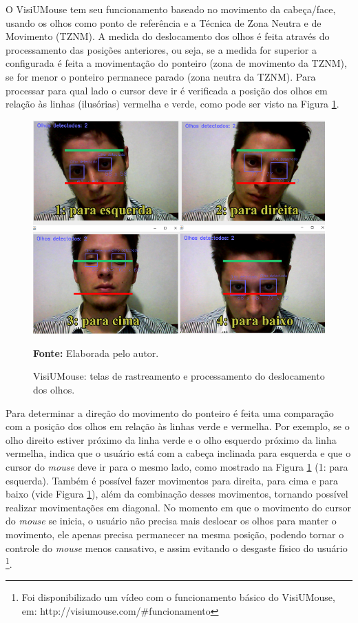 O VisiUMouse tem seu funcionamento baseado no movimento da cabeça/face, usando os olhos como ponto de referência e a Técnica de Zona Neutra e de Movimento (TZNM). A medida do deslocamento dos olhos é feita através do processamento das posições anteriores, ou seja, se a medida for superior a configurada é feita a movimentação do ponteiro (zona de movimento da TZNM), se for menor o ponteiro permanece parado (zona neutra da TZNM). Para processar para qual lado o cursor deve ir é verificada a posição dos olhos em relação às linhas (ilusórias) vermelha e verde, como pode ser visto na Figura \ref{fig:funcionamento}.

\begin{figure}[H]
\caption{VisiUMouse: telas de rastreamento e processamento do deslocamento dos olhos.}
\centering \includegraphics[scale=.8]{img/funcionamento2.png}

{\fontsize{11}{11}\selectfont \textbf{Fonte:} Elaborada pelo autor.}
\label{fig:funcionamento}
\end{figure}

Para determinar a direção do movimento do ponteiro é feita uma comparação com a posição dos olhos em relação às linhas verde e vermelha. Por exemplo, se o olho direito estiver próximo da linha verde e o olho esquerdo próximo da linha vermelha, indica que o usuário está com a cabeça inclinada para esquerda e que o cursor do \textit{mouse} deve ir para o mesmo lado, como mostrado na Figura \ref{fig:funcionamento} (1: para esquerda). Também é possível fazer movimentos para direita, para cima e para baixo (vide Figura \ref{fig:funcionamento}), além da combinação desses movimentos, tornando possível realizar movimentações em diagonal. No momento em que o movimento do cursor do \textit{mouse} se inicia, o usuário não precisa mais deslocar os olhos para manter o movimento, ele apenas precisa permanecer na mesma posição, podendo tornar o controle do \textit{mouse} menos cansativo, e assim evitando o desgaste físico do usuário \footnote{Foi disponibilizado um vídeo com o funcionamento básico do VisiUMouse, em: http://visiumouse.com/\#funcionamento}. 




